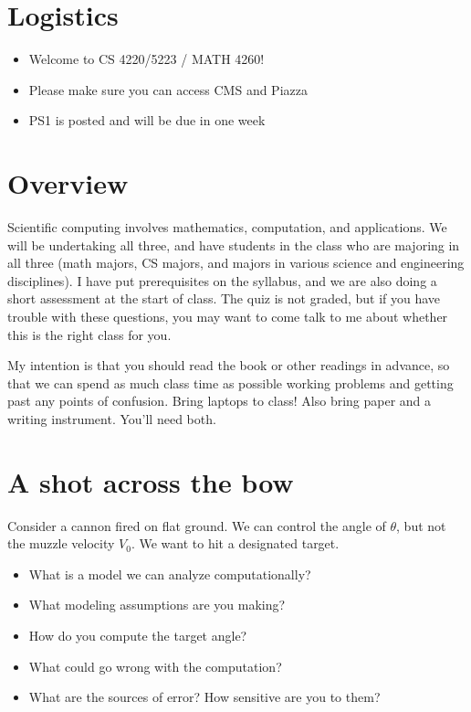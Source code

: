 \documentclass[12pt, leqno]{article}
\begin{document}

\section*{Logistics}

\begin{itemize}
\item Welcome to CS 4220/5223 / MATH 4260!
\item Please make sure you can access CMS and Piazza
\item PS1 is posted and will be due in one week
\end{itemize}

\section*{Overview}

Scientific computing involves mathematics, computation, and
applications.  We will be undertaking all three, and have students in
the class who are majoring in all three (math majors, CS majors, and
majors in various science and engineering disciplines).  I have put
prerequisites on the syllabus, and we are also doing a short
assessment at the start of class.  The quiz is not graded, but if you
have trouble with these questions, you may want to come talk to me
about whether this is the right class for you.

My intention is that you should read the book or other readings in
advance, so that we can spend as much class time as possible working
problems and getting past any points of confusion.  Bring laptops to class!
Also bring paper and a writing instrument.  You'll need both.

\section*{A shot across the bow}

Consider a cannon fired on flat ground.  We can control the angle of
$\theta$, but not the muzzle velocity $V_0$.  We want to hit a
designated target.
\begin{itemize}
\item
  What is a model we can analyze computationally?
\item
  What modeling assumptions are you making?
\item
  How do you compute the target angle?
\item
  What could go wrong with the computation?
\item
  What are the sources of error?  How sensitive are you to them?
\end{itemize}
\end{document}
